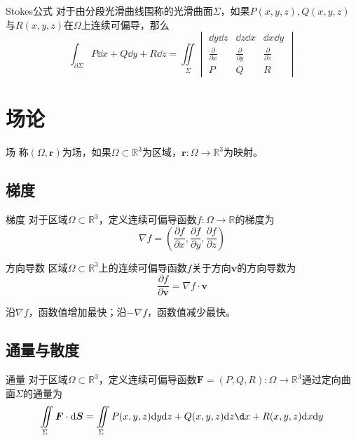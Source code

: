 \documentclass[lang = cn, scheme = chinese, thmcnt = section]{elegantbook}
\newcommand{\R}{\mathbb{R}}            %
\newcommand{\sub}{\subset}             %
\newcommand{\bs}{\boldsymbol}          %
\newcommand{\IInt}{\iint\limits}
\begin{document}
\begin{theorem}{Stokes公式}
	对于由分段光滑曲线围称的光滑曲面$\Sigma$，如果$P(x,y,z),Q(x,y,z)$与$R(x,y,z)$在$\Omega$上连续可偏导，那么
	$$
	\int_{\partial\Sigma}P\dd x+Q\dd y+R\dd z
	=\IInt_\Sigma\begin{vmatrix}
		\dd y\dd z & \dd z\dd x & \dd x\dd y\\
		\frac{\partial}{\partial x} & \frac{\partial}{\partial y} & \frac{\partial}{\partial z}\\
		P & Q & R
	\end{vmatrix}
	$$
\end{theorem}

\section{场论}

\begin{definition}{场}
	称$(\Omega,\bs{r})$为场，如果$\Omega\sub\R^3$为区域，$\bs{r}:\Omega\to\R^3$为映射。
\end{definition}

\subsection{梯度}

\begin{definition}{梯度}
	对于区域$\Omega\sub\R^3$，定义连续可偏导函数$f:\Omega\to\R$的梯度为
	$$
	\nabla f=\left(\frac{\partial f}{\partial x},\frac{\partial f}{\partial y},\frac{\partial f}{\partial z}\right)
	$$
\end{definition}

\begin{definition}{方向导数}
	区域$\Omega\sub\R^3$上的连续可偏导函数$f$关于方向$\bs{v}$的方向导数为
	$$
	\frac{\partial f}{\partial\bs{v}}=\nabla f\cdot\bs{v}
	$$
\end{definition}

\begin{theorem}
	沿$\nabla f$，函数值增加最快；沿$-\nabla f$，函数值减少最快。
\end{theorem}

\subsection{通量与散度}

\begin{definition}{通量}
	对于区域$\Omega\sub\R^3$，定义连续可偏导函数$\bs{F}=(P,Q,R):\Omega\to\R^3$通过定向曲面$\Sigma$的通量为
	$$
	\IInt_\Sigma \bs{F}\cdot \dd\bs{S}
	=\IInt_\Sigma P(x,y,z)\dd y\dd z+Q(x,y,z)\dd z\d x+R(x,y,z)\dd x\dd y
	$$
\end{definition}
\end{document}
